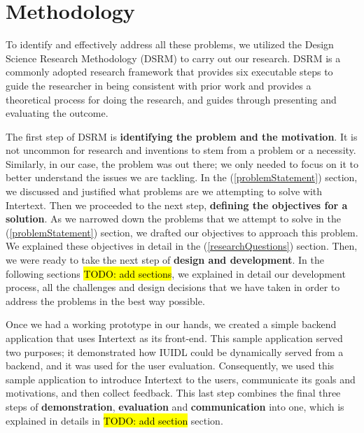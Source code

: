 
\section{Methodology} \label{methodology}

To identify and effectively address all these problems, we utilized the Design Science Research Methodology (DSRM) \cite{DSRM} to carry out our research. DSRM is a commonly adopted research framework that provides six executable steps to guide the researcher in being consistent with prior work and provides a theoretical process for doing the research, and guides through presenting and evaluating the outcome. 

The first step of DSRM is \textbf{identifying the problem and the motivation}. It is not uncommon for research and inventions to stem from a problem or a necessity. Similarly, in our case, the problem was out there; we only needed to focus on it to better understand the issues we are tackling. In the  (\ref{problemStatement}) section, we discussed and justified what problems are we attempting to solve with Intertext. Then we proceeded to the next step, \textbf{defining the objectives for a solution}. As we narrowed down the problems that we attempt to solve in the  (\ref{problemStatement}) section, we drafted our objectives to approach this problem. We explained these objectives in detail in the  (\ref{researchQuestions}) section. Then, we were ready to take the next step of \textbf{design and development}. In the following sections \hl{TODO: add sections}, we explained in detail our development process, all the challenges and design decisions that we have taken in order to address the problems in the best way possible. 

Once we had a working prototype in our hands, we created a simple backend application that uses Intertext as its front-end. This sample application served two purposes; it demonstrated how IUIDL could be dynamically served from a backend, and it was used for the user evaluation. Consequently, we used this sample application to introduce Intertext to the users, communicate its goals and motivations, and then collect feedback. This last step combines the final three steps of \textbf{demonstration}, \textbf{evaluation} and \textbf{communication} into one, which is explained in details in \hl{TODO: add section} section.